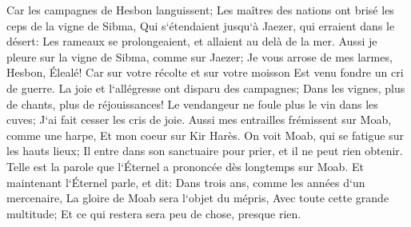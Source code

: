 \verse Car les campagnes de Hesbon languissent; Les maîtres des nations ont brisé les ceps de la vigne de Sibma, Qui s`étendaient jusqu`à Jaezer, qui erraient dans le désert: Les rameaux se prolongeaient, et allaient au delà de la mer. 
\verse Aussi je pleure sur la vigne de Sibma, comme sur Jaezer; Je vous arrose de mes larmes, Hesbon, Élealé! Car sur votre récolte et sur votre moisson Est venu fondre un cri de guerre. 
\verse La joie et l`allégresse ont disparu des campagnes; Dans les vignes, plus de chants, plus de réjouissances! Le vendangeur ne foule plus le vin dans les cuves; J`ai fait cesser les cris de joie. 
\verse Aussi mes entrailles frémissent sur Moab, comme une harpe, Et mon coeur sur Kir Harès. 
\verse On voit Moab, qui se fatigue sur les hauts lieux; Il entre dans son sanctuaire pour prier, et il ne peut rien obtenir. 
\verse Telle est la parole que l`Éternel a prononcée dès longtemps sur Moab. 
\verse Et maintenant l`Éternel parle, et dit: Dans trois ans, comme les années d`un mercenaire, La gloire de Moab sera l`objet du mépris, Avec toute cette grande multitude; Et ce qui restera sera peu de chose, presque rien. 

\chapter{}

